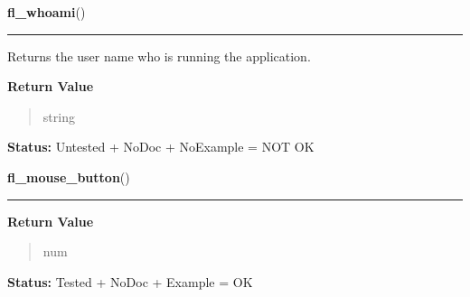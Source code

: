     \label{xformslib:library:fl_whoami}

    \vspace{0.5ex}

\hspace{.8\funcindent}\begin{boxedminipage}{\funcwidth}

    \raggedright \textbf{fl\_whoami}()

    \vspace{-1.5ex}

    \rule{\textwidth}{0.5\fboxrule}
\setlength{\parskip}{2ex}
    Returns the user name who is running the application.

\setlength{\parskip}{1ex}
      \textbf{Return Value}
    \vspace{-1ex}

      \begin{quote}
      string

      \end{quote}

\textbf{Status:} Untested + NoDoc + NoExample = NOT OK



    \end{boxedminipage}

    \label{xformslib:library:fl_mouse_button}

    \vspace{0.5ex}

\hspace{.8\funcindent}\begin{boxedminipage}{\funcwidth}

    \raggedright \textbf{fl\_mouse\_button}()

    \vspace{-1.5ex}

    \rule{\textwidth}{0.5\fboxrule}
\setlength{\parskip}{2ex}
\setlength{\parskip}{1ex}
      \textbf{Return Value}
    \vspace{-1ex}

      \begin{quote}
      num

      \end{quote}

\textbf{Status:} Tested + NoDoc + Example = OK



    \end{boxedminipage}

